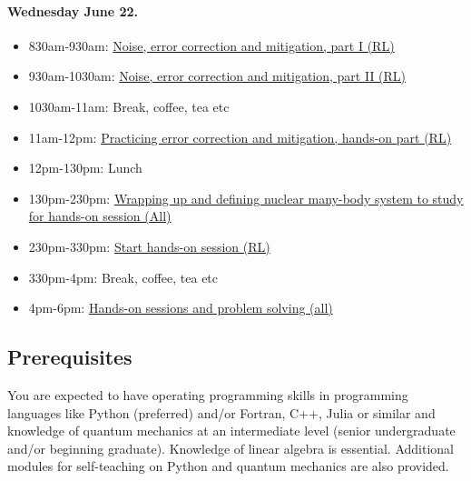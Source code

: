 \documentclass[%
oneside,                 %
final,                   %
10pt]{article}
\begin{document}
\paragraph{Wednesday June 22.}
\begin{itemize}
\item 830am-930am: \href{{https://nuclearphysicsworkshops.github.io/FRIB-TASummerSchoolQuantumComputing/doc/web/course.html}}{Noise, error correction and mitigation, part I (RL)}

\item 930am-1030am: \href{{https://nuclearphysicsworkshops.github.io/FRIB-TASummerSchoolQuantumComputing/doc/web/course.html}}{Noise, error correction and mitigation, part II (RL)}

\item 1030am-11am: Break, coffee, tea etc

\item 11am-12pm: \href{{https://nuclearphysicsworkshops.github.io/FRIB-TASummerSchoolQuantumComputing/doc/web/course.html}}{Practicing error correction and mitigation, hands-on part (RL)}

\item 12pm-130pm: Lunch

\item 130pm-230pm: \href{{https://nuclearphysicsworkshops.github.io/FRIB-TASummerSchoolQuantumComputing/doc/web/course.html}}{Wrapping up and defining nuclear many-body system to study for hands-on session (All)}

\item 230pm-330pm: \href{{https://nuclearphysicsworkshops.github.io/FRIB-TASummerSchoolQuantumComputing/doc/web/course.html}}{Start hands-on session (RL)}

\item 330pm-4pm: Break, coffee, tea etc

\item 4pm-6pm: \href{{https://nuclearphysicsworkshops.github.io/FRIB-TASummerSchoolQuantumComputing/doc/web/course.html}}{Hands-on sessions and problem solving (all)}
\end{itemize}

\noindent
\subsection*{Prerequisites}

You are expected to have operating programming skills in programming
languages like Python (preferred) and/or Fortran, C++, Julia or
similar and knowledge of quantum mechanics at an intermediate level
(senior undergraduate and/or beginning graduate). Knowledge of linear
algebra is essential.  Additional modules for self-teaching on Python
and quantum mechanics are also provided. 
\end{document}
